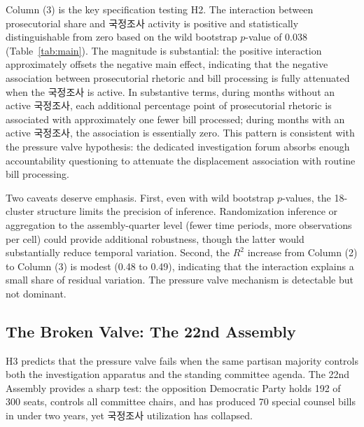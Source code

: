 \documentclass[11pt]{article}
\begin{document}
Column (3) is the key specification testing H2. The interaction between prosecutorial share and 국정조사 activity is positive and statistically distinguishable from zero based on the wild bootstrap $p$-value of 0.038 (Table~\ref{tab:main}). The magnitude is substantial: the positive interaction approximately offsets the negative main effect, indicating that the negative association between prosecutorial rhetoric and bill processing is fully attenuated when the 국정조사 is active. In substantive terms, during months without an active 국정조사, each additional percentage point of prosecutorial rhetoric is associated with approximately one fewer bill processed; during months with an active 국정조사, the association is essentially zero. This pattern is consistent with the pressure valve hypothesis: the dedicated investigation forum absorbs enough accountability questioning to attenuate the displacement association with routine bill processing.

Two caveats deserve emphasis. First, even with wild bootstrap $p$-values, the 18-cluster structure limits the precision of inference. Randomization inference or aggregation to the assembly-quarter level (fewer time periods, more observations per cell) could provide additional robustness, though the latter would substantially reduce temporal variation. Second, the $R^2$ increase from Column (2) to Column (3) is modest (0.48 to 0.49), indicating that the interaction explains a small share of residual variation. The pressure valve mechanism is detectable but not dominant.

\subsection{The Broken Valve: The 22nd Assembly}

H3 predicts that the pressure valve fails when the same partisan majority controls both the investigation apparatus and the standing committee agenda. The 22nd Assembly provides a sharp test: the opposition Democratic Party holds 192 of 300 seats, controls all committee chairs, and has produced 70 special counsel bills in under two years, yet 국정조사 utilization has collapsed.
\end{document}
